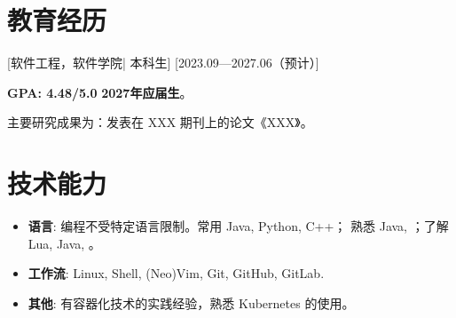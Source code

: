 \documentclass{resume}
\begin{document}


\ResumeTitle


\section{教育经历}
[\textnormal{软件工程，软件学院|}  本科生]
[2023.09—2027.06（预计）]

\textbf{GPA: 4.48/5.0} \textbf{2027年应届生}。

主要研究成果为：发表在 XXX 期刊上的论文《XXX》。

\section[技术能力]{技术能力}
\begin{itemize}
  \item \textbf{语言}: 编程不受特定语言限制。常用 Java, Python, C++； 熟悉 Java, ；了解 Lua, Java, 。
  \item \textbf{工作流}: Linux, Shell, (Neo)Vim, Git, GitHub, GitLab.
  \item \textbf{其他}: 有容器化技术的实践经验，熟悉 Kubernetes 的使用。
\end{itemize}



\end{document}
